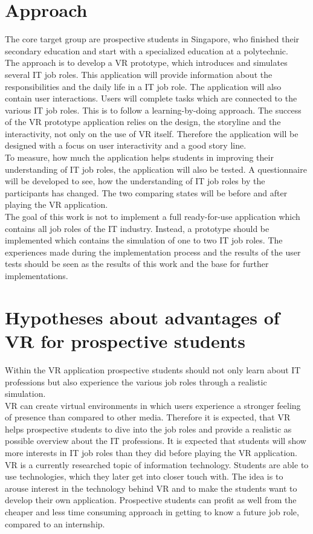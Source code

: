 \section{Approach}
The core target group are prospective students in Singapore, who finished their secondary education and start with a specialized education at a polytechnic.\\
The approach is to develop a VR prototype, which introduces and simulates several IT job roles. This application will provide information about the responsibilities and the daily life in a IT job role. The application will also contain user interactions. Users will complete tasks which are connected to the various IT job roles. This is to follow a learning-by-doing approach. The success of the VR prototype application relies on the design, the storyline and the interactivity, not only on the use of VR itself. Therefore the application will be designed with a focus on user interactivity and a good story line.\\
To measure, how much the application helps students in improving their understanding of IT job roles, the application will also be tested. A questionnaire will be developed to see, how the understanding of IT job roles by the participants has changed. The two comparing states will be before and after playing the VR application.\\
The goal of this work is not to implement a full ready-for-use application which contains all job roles of the IT industry. Instead, a prototype should be implemented which contains the simulation of one to two IT job roles. The experiences made during the implementation process and the results of the user tests should be seen as the results of this work and the base for further implementations.

\section{Hypotheses about advantages of VR for prospective students}
Within the VR application prospective students should not only learn about IT professions but also experience the various job roles through a realistic simulation.\\
VR can create virtual environments in which users experience a stronger feeling of presence than compared to other media. Therefore it is expected, that VR helps prospective students to dive into the job roles and provide a realistic as possible overview about the IT professions. It is expected that students will show more interests in IT job roles than they did before playing the VR application. \\
VR is a currently researched topic of information technology. Students are able to use technologies, which they later get into closer touch with. The idea is to arouse interest in the technology behind VR and to make the students want to develop their own application. Prospective students can profit as well from the cheaper and less time consuming approach in getting to know a future job role, compared to an internship. 


